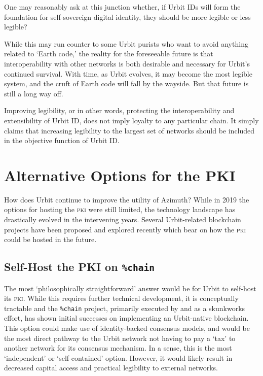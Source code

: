 \documentclass[twoside]{article}
\begin{document}
One may reasonably ask at this junction whether, if Urbit IDs will form the foundation for self-sovereign digital identity, they should be more legible or less legible?

While this may run counter to some Urbit purists who want to avoid anything related to `Earth code,' the reality for the foreseeable future is that interoperability with other networks is both desirable and necessary for Urbit's continued survival. With time, as Urbit evolves, it may become the most legible system, and the cruft of Earth code will fall by the wayside. But that future is still a long way off.

Improving legibility, or in other words, protecting the interoperability and extensibility of Urbit ID, does not imply loyalty to any particular chain. It simply claims that increasing legibility to the largest set of networks should be included in the objective function of Urbit ID.

\section[{Alternative Options for the \textsc{pki}}]{Alternative Options for the PKI}

How does Urbit continue to improve the utility of Azimuth? While in 2019 the options for hosting the \textsc{pki} were still limited, the technology landscape has drastically evolved in the intervening years.  Several Urbit-related blockchain projects have been proposed and explored recently which bear on how the \textsc{pki} could be hosted in the future.

\subsection[Self-Host the \textsc{pki} on \texttt{\%chain}]{Self-Host the PKI on \texttt{\%chain}}

The most `philosophically straightforward' answer would be for Urbit to self-host its \textsc{pki}. While this requires further technical development, it is conceptually tractable and the \lstinline[style=inlinecode]{%chain} project, primarily executed by  and  as a skunkworks effort, has shown initial successes on implementing an Urbit-native blockchain. This option could make use of identity-backed consensus models, and would be the most direct pathway to the Urbit network not having to pay a `tax' to another network for its consensus mechanism. In a sense, this is the most `independent' or `self-contained' option. However, it would likely result in decreased capital access and practical legibility to external networks.
\end{document}
